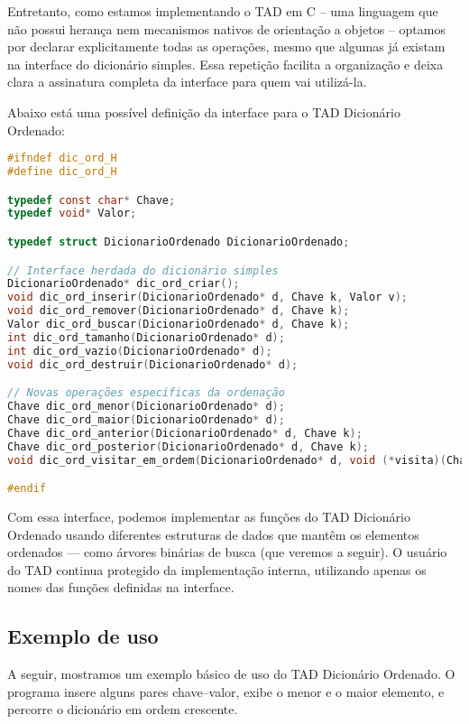 Entretanto, como estamos implementando o TAD em C -- uma linguagem que não possui herança nem mecanismos nativos de orientação a objetos -- optamos por declarar explicitamente todas as operações, mesmo que algumas já existam na interface do dicionário simples. 
Essa repetição facilita a organização e deixa clara a assinatura completa da interface para quem vai utilizá-la.

Abaixo está uma possível definição da interface para o TAD Dicionário Ordenado:

\begin{lstlisting}[language=C, caption={Interface do TAD Dicionário Ordenado}, label={lst:dicionario-ordenado-h}]
#ifndef dic_ord_H
#define dic_ord_H

typedef const char* Chave;
typedef void* Valor;

typedef struct DicionarioOrdenado DicionarioOrdenado;

// Interface herdada do dicionário simples
DicionarioOrdenado* dic_ord_criar();
void dic_ord_inserir(DicionarioOrdenado* d, Chave k, Valor v);
void dic_ord_remover(DicionarioOrdenado* d, Chave k);
Valor dic_ord_buscar(DicionarioOrdenado* d, Chave k);
int dic_ord_tamanho(DicionarioOrdenado* d);
int dic_ord_vazio(DicionarioOrdenado* d);
void dic_ord_destruir(DicionarioOrdenado* d);

// Novas operações específicas da ordenação
Chave dic_ord_menor(DicionarioOrdenado* d);
Chave dic_ord_maior(DicionarioOrdenado* d);
Chave dic_ord_anterior(DicionarioOrdenado* d, Chave k);
Chave dic_ord_posterior(DicionarioOrdenado* d, Chave k);
void dic_ord_visitar_em_ordem(DicionarioOrdenado* d, void (*visita)(Chave, Valor));

#endif
\end{lstlisting}

Com essa interface, podemos implementar as funções do TAD Dicionário Ordenado usando diferentes estruturas de dados que mantêm os elementos ordenados — como árvores binárias de busca (que veremos a seguir). 
O usuário do TAD continua protegido da implementação interna, utilizando apenas os nomes das funções definidas na interface.

\subsection{Exemplo de uso}

A seguir, mostramos um exemplo básico de uso do TAD Dicionário Ordenado. 
O programa insere alguns pares chave–valor, exibe o menor e o maior elemento, e percorre o dicionário em ordem crescente.


